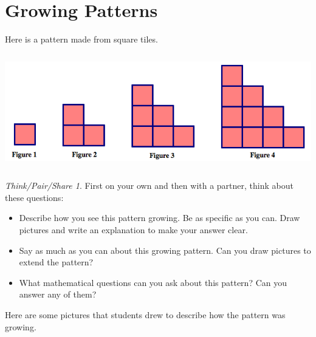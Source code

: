 \documentclass[12pt, reqno]{amsart}
\theoremstyle{remark}
\newtheorem*{thinkpair*}{Think/Pair/Share}
\theoremstyle{definition}
\numberwithin{equation}{section}  %
\begin{document}
\newpage

\section{Growing Patterns}
Here is a pattern made from square tiles.

\begin{center}
\includegraphics[height=5cm]{staircase}
\end{center}


\bigskip
\bigskip



\begin{thinkpair*}
First on your own and then with a partner, think about these questions:
\begin{itemize}
\item
Describe how you see this pattern growing.  Be as specific as you can.  Draw pictures and write an explanation to make your answer clear.\\

\item
Say as much as you can about this growing pattern.  Can you draw pictures to extend the pattern?  \\

\item
What mathematical questions can you ask about this pattern?  Can you answer any of them?\\
\end{itemize}
\end{thinkpair*}

\newpage

Here are some pictures that students drew to describe how the pattern was growing.  
\end{document}
